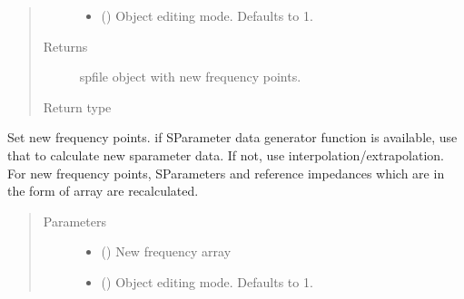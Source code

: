 \documentclass[letterpaper,10pt,english]{sphinxmanual}
\begin{document}
\begin{fulllineitems}
\begin{fulllineitems}
\begin{quote}
\begin{description}
\begin{itemize}
\item {} 
 (\sphinxstyleliteralemphasis{\sphinxupquote{, }}) \textendash{} Object editing mode. Defaults to \sphinxhyphen{}1.

\end{itemize}

\item[{Returns}] \leavevmode
spfile object with new frequency points.

\item[{Return type}] \leavevmode
{\hyperref[\detokenize{touchstone:touchstone.spfile}]{}}

\end{description}\end{quote}

\end{fulllineitems}


\begin{fulllineitems}
\label{\detokenize{touchstone:touchstone.spfile.set_frequency_points}}
Set new frequency points. if S\sphinxhyphen{}Parameter data generator function is available, use that to calculate new s\sphinxhyphen{}parameter data. If not, use interpolation/extrapolation.
For new frequency points, S\sphinxhyphen{}Parameters and reference impedances which are in the form of array are re\sphinxhyphen{}calculated.
\begin{quote}\begin{description}
\item[{Parameters}] \leavevmode\begin{itemize}
\item {} 
 () \textendash{} New frequency array

\item {} 
 (\sphinxstyleliteralemphasis{\sphinxupquote{, }}) \textendash{} Object editing mode. Defaults to \sphinxhyphen{}1.


\end{itemize}
\end{description}
\end{quote}
\end{fulllineitems}
\end{fulllineitems}
\end{document}
